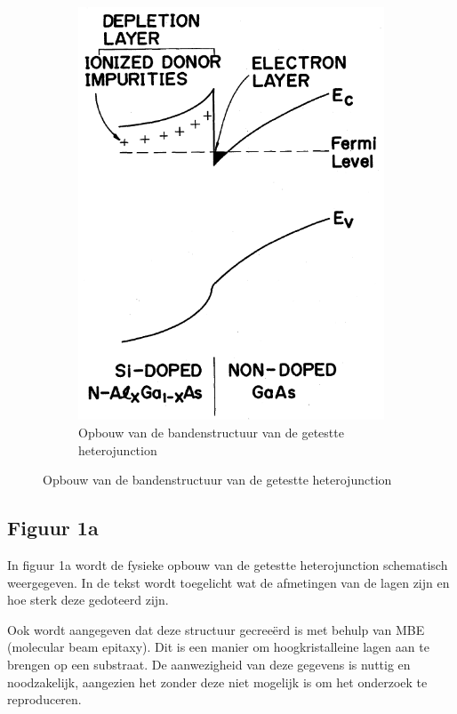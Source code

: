 \documentclass[11pt]{article}
\begin{document}
\begin{figure}[h]
\begin{subfigure}[b]{0.45\textwidth}
    \includegraphics[width=\textwidth]{bandenergy_structure.png}
    \caption{Opbouw van de bandenstructuur van de getestte heterojunction}
    \label{fig:band_structure}
  \end{subfigure}
\end{figure}

\subsection{Figuur 1a}
In figuur 1a wordt de fysieke opbouw van de getestte heterojunction schematisch weergegeven. In de tekst wordt toegelicht wat de afmetingen van de lagen zijn en hoe sterk deze gedoteerd zijn.

Ook wordt aangegeven dat deze structuur gecree\"erd is met behulp van MBE (molecular beam epitaxy). Dit is een manier om hoogkristalleine lagen aan te brengen op een substraat. De aanwezigheid van deze gegevens is nuttig en noodzakelijk, aangezien het zonder deze niet mogelijk is om het onderzoek te reproduceren.
\end{document}
